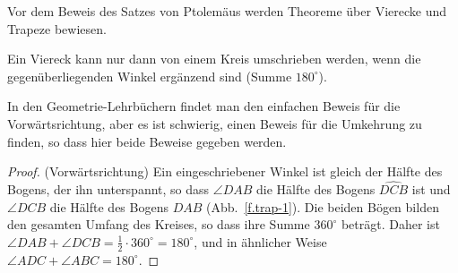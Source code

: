 Vor dem Beweis des Satzes von Ptolemäus werden Theoreme über Vierecke und Trapeze bewiesen.

\begin{theorem}\label{thm.quad-circum}
Ein Viereck kann nur dann von einem Kreis umschrieben werden, wenn die gegenüberliegenden Winkel ergänzend sind (Summe $180^\circ$).
\end{theorem}

In den Geometrie-Lehrbüchern findet man den einfachen Beweis für die Vorwärtsrichtung, aber es ist schwierig, einen Beweis für die Umkehrung zu finden, so dass hier beide Beweise gegeben werden.

\begin{proof}(Vorwärtsrichtung)
Ein eingeschriebener Winkel ist gleich der Hälfte des Bogens, der ihn unterspannt, so dass $\angle DAB$ die Hälfte des Bogens $\widehat{DCB}$ ist und $\angle DCB$ die Hälfte des Bogens $\widehat{DAB}$ (Abb.~\ref{f.trap-1}). Die beiden Bögen bilden den gesamten Umfang des Kreises, so dass ihre Summe $360^\circ$ beträgt. Daher ist $\angle DAB + \angle DCB = \frac{1}{2} \cdot 360^\circ = 180^\circ$, und in ähnlicher Weise $\angle ADC + \angle ABC = 180^\circ$.
\end{proof}
